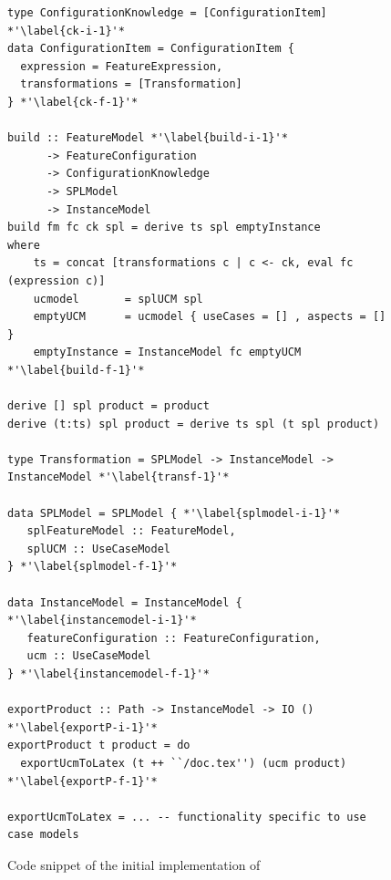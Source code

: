 
\begin{figure}[t!]
\begin{lstlisting}
type ConfigurationKnowledge = [ConfigurationItem] *'\label{ck-i-1}'*
data ConfigurationItem = ConfigurationItem {
  expression = FeatureExpression,
  transformations = [Transformation]
} *'\label{ck-f-1}'*

build :: FeatureModel *'\label{build-i-1}'*
      -> FeatureConfiguration
      -> ConfigurationKnowledge
      -> SPLModel
      -> InstanceModel
build fm fc ck spl = derive ts spl emptyInstance
where
    ts = concat [transformations c | c <- ck, eval fc (expression c)]
    ucmodel       = splUCM spl
    emptyUCM      = ucmodel { useCases = [] , aspects = [] }
    emptyInstance = InstanceModel fc emptyUCM *'\label{build-f-1}'*

derive [] spl product = product
derive (t:ts) spl product = derive ts spl (t spl product)

type Transformation = SPLModel -> InstanceModel -> InstanceModel *'\label{transf-1}'*

data SPLModel = SPLModel { *'\label{splmodel-i-1}'*
   splFeatureModel :: FeatureModel,
   splUCM :: UseCaseModel
} *'\label{splmodel-f-1}'*

data InstanceModel = InstanceModel { *'\label{instancemodel-i-1}'*
   featureConfiguration :: FeatureConfiguration,
   ucm :: UseCaseModel
} *'\label{instancemodel-f-1}'*

exportProduct :: Path -> InstanceModel -> IO () *'\label{exportP-i-1}'*
exportProduct t product = do
  exportUcmToLatex (t ++ ``/doc.tex'') (ucm product) *'\label{exportP-f-1}'*

exportUcmToLatex = ... -- functionality specific to use case models
\end{lstlisting}
\caption{Code snippet of the initial implementation of \hp}
\label{fig:hp-initial}
\end{figure}


